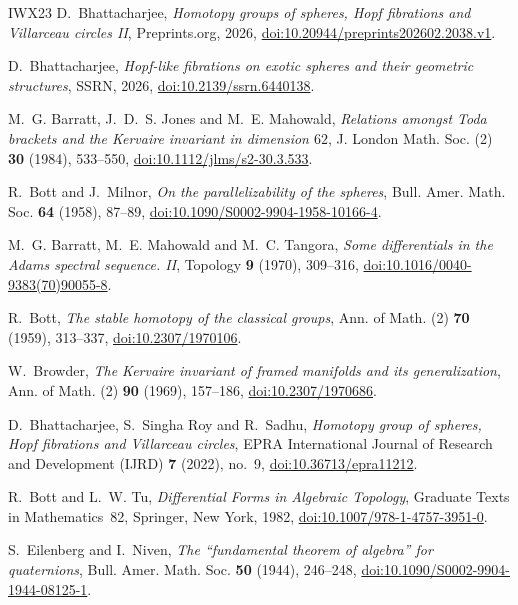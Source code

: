 \documentclass[11pt]{amsart}
\numberwithin{equation}{section}
\theoremstyle{plain}
\theoremstyle{definition}
\theoremstyle{remark}
\begin{document}
\begin{thebibliography}{IWX23}
 D.~Bhattacharjee, \emph{Homotopy groups of spheres, Hopf fibrations and Villarceau circles II}, Preprints.org, 2026, \href{https://doi.org/10.20944/preprints202602.2038.v1}{doi:10.20944/preprints202602.2038.v1}.

 D.~Bhattacharjee, \emph{Hopf-like fibrations on exotic spheres and their geometric structures}, SSRN, 2026, \href{https://doi.org/10.2139/ssrn.6440138}{doi:10.2139/ssrn.6440138}.

 M.~G. Barratt, J.~D.~S. Jones and M.~E. Mahowald, \emph{Relations amongst Toda brackets and the Kervaire invariant in dimension $62$}, J. London Math. Soc. (2) \textbf{30} (1984), 533--550, \href{https://doi.org/10.1112/jlms/s2-30.3.533}{doi:10.1112/jlms/s2-30.3.533}.

 R.~Bott and J.~Milnor, \emph{On the parallelizability of the spheres}, Bull. Amer. Math. Soc. \textbf{64} (1958), 87--89, \href{https://doi.org/10.1090/S0002-9904-1958-10166-4}{doi:10.1090/S0002-9904-1958-10166-4}.

 M.~G. Barratt, M.~E. Mahowald and M.~C. Tangora, \emph{Some differentials in the Adams spectral sequence. II}, Topology \textbf{9} (1970), 309--316, \href{https://doi.org/10.1016/0040-9383(70)90055-8}{doi:10.1016/0040-9383(70)90055-8}.

 R.~Bott, \emph{The stable homotopy of the classical groups}, Ann. of Math. (2) \textbf{70} (1959), 313--337, \href{https://doi.org/10.2307/1970106}{doi:10.2307/1970106}.

 W.~Browder, \emph{The Kervaire invariant of framed manifolds and its generalization}, Ann. of Math. (2) \textbf{90} (1969), 157--186, \href{https://doi.org/10.2307/1970686}{doi:10.2307/1970686}.

 D.~Bhattacharjee, S.~Singha Roy and R.~Sadhu, \emph{Homotopy group of spheres, Hopf fibrations and Villarceau circles}, EPRA International Journal of Research and Development (IJRD) \textbf{7} (2022), no.~9, \href{https://doi.org/10.36713/epra11212}{doi:10.36713/epra11212}.

 R.~Bott and L.~W. Tu, \emph{Differential Forms in Algebraic Topology}, Graduate Texts in Mathematics~82, Springer, New York, 1982, \href{https://doi.org/10.1007/978-1-4757-3951-0}{doi:10.1007/978-1-4757-3951-0}.

 S.~Eilenberg and I.~Niven, \emph{The ``fundamental theorem of algebra'' for quaternions}, Bull. Amer. Math. Soc. \textbf{50} (1944), 246--248, \href{https://doi.org/10.1090/S0002-9904-1944-08125-1}{doi:10.1090/S0002-9904-1944-08125-1}.


\end{thebibliography}
\end{document}
